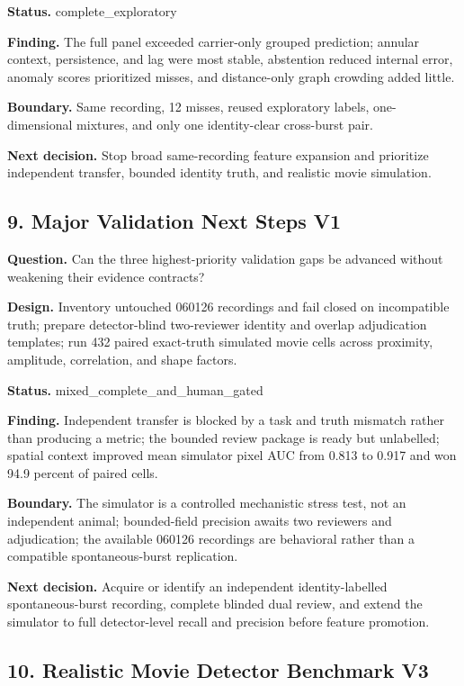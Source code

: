 \textbf{Status.} complete\_exploratory

\textbf{Finding.} The full panel exceeded carrier-only grouped prediction; annular context, persistence, and lag were most stable, abstention reduced internal error, anomaly scores prioritized misses, and distance-only graph crowding added little.

\textbf{Boundary.} Same recording, 12 misses, reused exploratory labels, one-dimensional mixtures, and only one identity-clear cross-burst pair.

\textbf{Next decision.} Stop broad same-recording feature expansion and prioritize independent transfer, bounded identity truth, and realistic movie simulation.

\subsection{9. Major Validation Next Steps V1}

\textbf{Question.} Can the three highest-priority validation gaps be advanced without weakening their evidence contracts?

\textbf{Design.} Inventory untouched 060126 recordings and fail closed on incompatible truth; prepare detector-blind two-reviewer identity and overlap adjudication templates; run 432 paired exact-truth simulated movie cells across proximity, amplitude, correlation, and shape factors.

\textbf{Status.} mixed\_complete\_and\_human\_gated

\textbf{Finding.} Independent transfer is blocked by a task and truth mismatch rather than producing a metric; the bounded review package is ready but unlabelled; spatial context improved mean simulator pixel AUC from 0.813 to 0.917 and won 94.9 percent of paired cells.

\textbf{Boundary.} The simulator is a controlled mechanistic stress test, not an independent animal; bounded-field precision awaits two reviewers and adjudication; the available 060126 recordings are behavioral rather than a compatible spontaneous-burst replication.

\textbf{Next decision.} Acquire or identify an independent identity-labelled spontaneous-burst recording, complete blinded dual review, and extend the simulator to full detector-level recall and precision before feature promotion.

\subsection{10. Realistic Movie Detector Benchmark V3}

